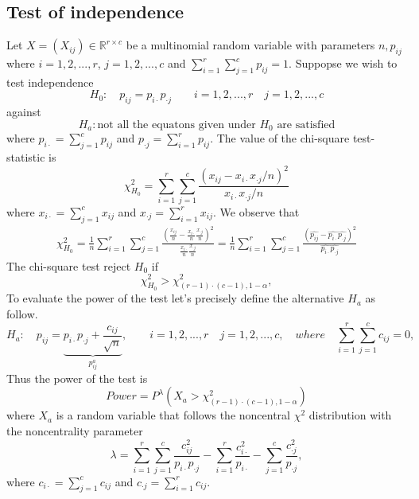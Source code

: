 \documentclass{article}
\begin{document}
\subsection{Test of independence}
Let $X=(X_{ij}) \in \mathbb{R}^{r \times c}$ be a multinomial random variable with
parameters $n,p_{ij}$ where $i=1,2,...,r$, $j=1,2,...,c$ and 
$\sum_{i=1}^r\sum_{j=1}^cp_{ij}=1$. 
Suppopse we wish to test independence
\begin{equation}
    H_0: \quad p_{ij}=p_{i \cdot}p_{\cdot j} \qquad i =1,2,...,r \quad j=1,2,...,c
\end{equation}
against
\begin{equation}
    H_a: \mbox{not all the equatons given under $H_0$ are satisfied}
\end{equation}
where $p_{i \cdot} = \sum_{j=1}^c p_{ij}$ and $p_{\cdot j} = \sum_{i=1}^r p_{ij}$.
The value of the chi-square test-statistic is
\begin{equation}
    \chi^2_{H_0} = \sum_{i=1}^r\sum_{j=1}^c \frac{\left(x_{ij} - x_{i \cdot}x_{\cdot j}/n\right)^2}{x_{i \cdot}x_{\cdot j}/n}
\end{equation}
where $x_{i \cdot} = \sum_{j=1}^c x_{ij}$ and $x_{\cdot j} = \sum_{i=1}^r x_{ij}$.
We observe that
\begin{align}
    \chi^2_{H_0} =\frac{1}{n} \sum_{i=1}^r\sum_{j=1}^c \frac{\left(\frac{x_{ij}}{n} - \frac{x_{i \cdot}}{n}\frac{x_{\cdot j}}{n}\right)^2}{\frac{x_{i \cdot}}{n}\frac{x_{\cdot j}}{n}}=  \frac{1}{n} \sum_{i=1}^r\sum_{j=1}^c \frac{\left(\widehat{p_{ij}} - \widehat{p_{i \cdot}}\widehat{p_{\cdot j}}\right)^2}{\widehat{p_{i \cdot}}\widehat{p_{\cdot j}}}
\end{align}
The chi-square test reject $H_0$ if
\begin{equation}
    \chi^2_{H_0} > \chi^2_{(r-1)\cdot(c-1),1-\alpha},
\end{equation}
To evaluate the power of the test let's precisely define the alternative $H_a$ as follow.
\begin{equation}
    H_a: \quad p_{ij} =\underbrace{p_{i\cdot}p_{\cdot j} + \frac{c_{ij}}{\sqrt{n}}}_{p^a_{ij}}, \qquad i =1,2,...,r \quad j=1,2,...,c, \quad where \quad \sum_{i=1}^{r}\sum_{j=1}^{c}c_{ij}=0, 
\end{equation}
Thus the power of the test is
\begin{equation}
    Power = P^{\lambda}\left(X_a > \chi^2_{(r-1)\cdot(c-1),1-\alpha}\right)
\end{equation}
where $X_a$ is a random variable that follows the noncentral $\chi^2$ distribution with the noncentrality parameter
\begin{equation}
    \lambda = \sum_{i=1}^{r}\sum_{j=1}^c \frac{c_{ij}^2}{p_{i\cdot}p_{\cdot j}} - \sum_{i=1}^{r}\frac{c_{i \cdot}^2}{p_{i \cdot}} - \sum_{j=1}^{c}\frac{c_{\cdot j}^2}{p_{\cdot j}},
\end{equation}
where $c_{i \cdot} = \sum_{j=1}^c c_{ij}$ and $c_{\cdot j} = \sum_{i=1}^r c_{ij}$.
\end{document}
